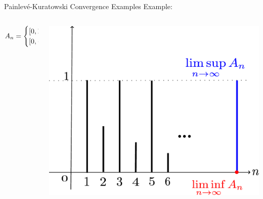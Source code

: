 \documentclass[aspectratio=169, dvipdfmx, 11pt]{beamer} %
\newcommand{\Painleve}{Painlev\'e}
\begin{document}
\begin{frame}[t]{\Painleve-Kuratowski Convergence Examples}
Example:

\centering
\begin{columns}
    \begin{column}{0.48\textwidth}
    \centering
    \begin{equation}
        A_n = \begin{cases} [0, 1],  & \mbox{if }n\mbox{ is odd} \\ [0, \frac{1}{n}], & \mbox{if }n\mbox{ is even} \end{cases} \notag
    \end{equation}
    \end{column}
    \pause
    \begin{column}{0.48\textwidth}
    \centering
    \includegraphics[keepaspectratio, scale=0.160]{figures/example_limsup_and_liminf.eps}
    \end{column}
\end{columns}
\end{frame}
\end{document}
